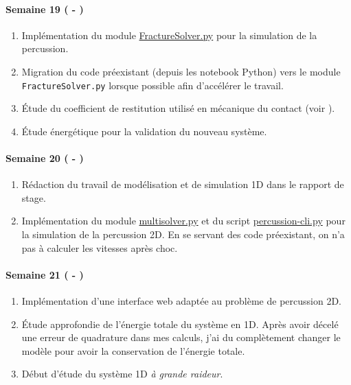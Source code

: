 \paragraph{Semaine 19 ( - )} 
\begin{enumerate}
    \item Implémentation du module \href{https://github.com/desmond-rn/ice-floes/blob/master/code/simu1D/FractureSolver.py}{FractureSolver.py} pour la simulation de la percussion.
    \item Migration du code préexistant (depuis les notebook Python) vers le module \texttt{FractureSolver.py} lorsque possible afin d'accélérer le travail.
    \item Étude du coefficient de restitution utilisé en mécanique du contact (voir \parencite[p.21]{acary2004coefficients}).
    \item Étude énergétique pour la validation du nouveau système.
\end{enumerate}
  

\paragraph{Semaine 20 ( - )} 
\begin{enumerate}
    \item Rédaction du travail de modélisation et de simulation 1D dans le rapport de stage.
    \item Implémentation du module \href{https://framagit.org/RaK/SimuRessorts/-/blob/master/springslattice/multisolver.py}{multisolver.py} et du script \href{https://framagit.org/RaK/SimuRessorts/-/blob/master/percussion-cli.py}{percussion-cli.py} pour la simulation de la percussion 2D. En se servant des code préexistant, on n'a pas à calculer les vitesses après choc. 
\end{enumerate}
  
\paragraph{Semaine 21 ( - )} 
\begin{enumerate}
    \item Implémentation d'une interface web adaptée au problème de percussion 2D. 
    \item Étude approfondie de l'énergie totale du système en 1D. Après avoir décelé une erreur de quadrature dans mes calculs, j'ai du complètement changer le modèle pour avoir la conservation de l'énergie totale.
    \item Début d'étude du système 1D \emph{à grande raideur}.
\end{enumerate}
  
